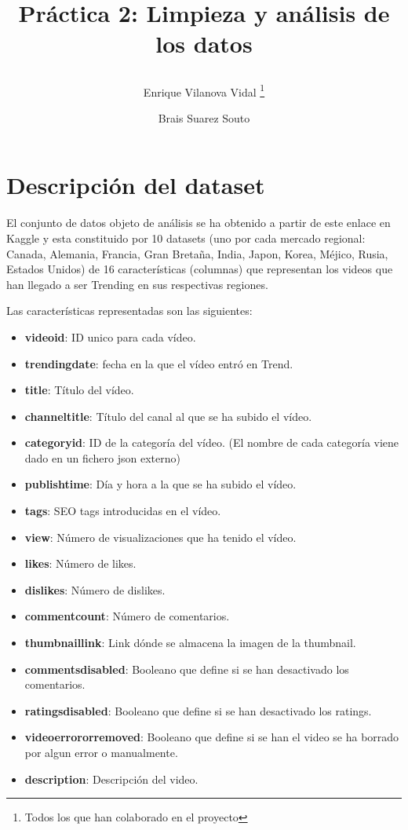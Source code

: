 \documentclass[a4paper,12pt]{article}
\title{%

Pr\'actica 2: Limpieza y an\'alisis de los datos
	
	\author{%
	Enrique Vilanova Vidal%
		\thanks{Todos los que han colaborado en el proyecto}
	\and Brais Suarez Souto
	}
}
\begin{document}
\maketitle
\thispagestyle{empty}
\clearpage
{} 
\newpage

\section[item_descripcion]{Descripci\'on del dataset}

El conjunto de datos objeto de an\'alisis se ha obtenido a partir de este enlace en Kaggle y esta constituido por 10 datasets (uno por cada mercado regional: Canada, Alemania, Francia, Gran Breta\~na, India, Japon, Korea, M\'ejico, Rusia, Estados Unidos) de 16 caracter\'isticas (columnas) que representan los videos que han llegado a ser Trending en sus respectivas regiones.

Las caracter\'isticas representadas son las siguientes:

\begin{itemize}

\item \textbf{video{\textunderscore}id}: ID unico para cada v\'ideo.
\item \textbf{trending{\textunderscore}date}: fecha en la que el v\'ideo entr\'o en Trend.
\item \textbf{title}: T\'itulo del v\'ideo.
\item \textbf{channel{\textunderscore}title}: T\'itulo del canal al que se ha subido el v\'ideo.
\item \textbf{category{\textunderscore}id}: ID de la categor\'ia del v\'ideo. (El nombre de cada categor\'ia viene dado en un fichero json externo)
\item \textbf{publish{\textunderscore}time}: D\'ia y hora a la que se ha subido el v\'ideo.
\item \textbf{tags}: SEO tags introducidas en el v\'ideo.
\item \textbf{view}: N\'umero de visualizaciones que ha tenido el v\'ideo.
\item \textbf{likes}: N\'umero de likes.
\item \textbf{dislikes}: N\'umero de dislikes.
\item \textbf{comment{\textunderscore}count}: N\'umero de comentarios.
\item \textbf{thumbnail{\textunderscore}link}: Link d\'onde se almacena la imagen de la thumbnail.
\item \textbf{comments{\textunderscore}disabled}: Booleano que define si se han desactivado los comentarios.
\item \textbf{ratings{\textunderscore}disabled}: Booleano que define si se han desactivado los ratings.
\item \textbf{video{\textunderscore}error{\textunderscore}or{\textunderscore}removed}: Booleano que define si se han el video se ha borrado por algun error o manualmente.
\item \textbf{description}: Descripci\'on del video.

\end{itemize}
\end{document}

